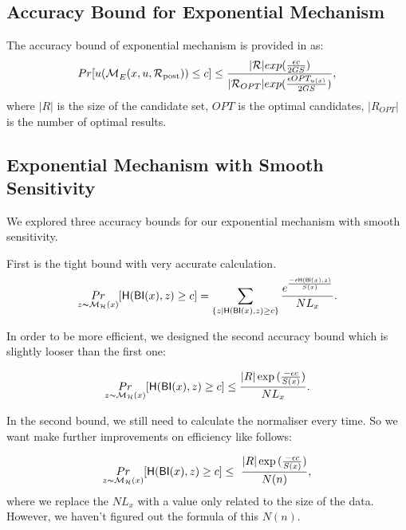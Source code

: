 \documentclass[sigconf]{acmart}
\begin{document}
\subsection{Accuracy Bound for Exponential Mechanism}
\label{subsec_accuracy_global}
The accuracy bound of exponential mechanism is provided in \cite{dwork2014algorithmic} as:
\begin{equation*}
Pr[u(\mathcal{M}_E^{}({x},{u},{\mathcal{R}_{\textup{post}}})) \leq c] 
		 \leq \frac{|\mathcal{R}|exp(\frac{\epsilon c}{2 GS})}{|\mathcal{R}_{OPT}| exp(\frac{\epsilon OPT_{u(x)}}{2 GS})},
\end{equation*}
where $|R|$ is the size of the candidate set, $OPT$ is the optimal candidates, $|R_{OPT}|$ is the number of optimal results.


\subsection{Exponential Mechanism with Smooth Sensitivity}
\label{subsec_accuracy_smoo}
We explored three accuracy bounds for our exponential mechanism with smooth sensitivity.

First is the tight bound with very accurate calculation.
\begin{equation*}
\underset{z \thicksim \mathcal{M}_{\mathcal{H}}(x)}{Pr}[ \mathsf{H}(\mathsf{BI}(x), z) \geq c] = \sum\limits_{\{z | \mathsf{H}(\mathsf{BI}(x), z) \geq c\}} \frac{e^{\frac{- \epsilon \mathsf{H}(\mathsf{BI}(x), z)}{S(x)}}}{NL_x}.
\end{equation*}

In order to be more efficient, we designed the second accuracy bound which is slightly looser than the first one:

\begin{equation*}
\underset{z \thicksim \mathcal{M}_{\mathcal{H}}(x)}{Pr}[ \mathsf{H}(\mathsf{BI}(x), z) \geq c] \leq \frac{|R| \exp{(\frac{- \epsilon c}{S(x)}})}{NL_x}.
\end{equation*}

In the second bound, we still need to calculate the normaliser every time. So we want make further improvements on efficiency like follows:

\begin{equation*}
\underset{z \thicksim \mathcal{M}_{\mathcal{H}}(x)}{Pr}[ \mathsf{H}(\mathsf{BI}(x), z) \geq c] \leq \ \frac{|R| \exp{(\frac{- \epsilon c}{S(x)}})}{N(n)},
\end{equation*}
where we replace the $NL_x$ with a value only related to the size of the data. However, we haven't figured out the formula of this $N(n)$.
\end{document}
